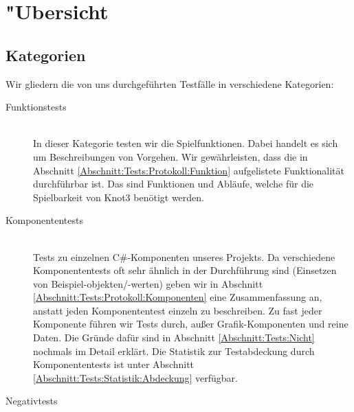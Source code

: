 %



\section{{"U}bersicht}
\label{Abschnitt:Tests:Uebersicht}



\subsection{Kategorien}
\label{Abschnitt:Tests:Uebersicht:Kategorien}

Wir gliedern die von uns durchgeführten Testfälle in verschiedene Kategorien:\\


\begin{description} %


	\item[Funktionstests] \hfill
	\\
	
	In dieser Kategorie testen wir die Spielfunktionen. Dabei handelt es sich um Beschreibungen von Vorgehen. Wir gewährleisten, dass die in Abschnitt \ref{Abschnitt:Tests:Protokoll:Funktion} aufgelistete Funktionalität durchführbar ist. Das sind Funktionen und Abläufe, welche für die Spielbarkeit von Knot3 benötigt werden.\\
	  
	
	\item[Komponententests] \hfill
	\\
	
	Tests zu einzelnen C\#-Komponenten unseres Projekts. Da verschiedene Komponententests oft sehr ähnlich in der Durchführung sind (Einsetzen von Beispiel-objekten/-werten) geben wir in Abschnitt \ref{Abschnitt:Tests:Protokoll:Komponenten} eine Zusammenfassung an, anstatt jeden Komponententest einzeln zu beschreiben.
	Zu fast jeder Komponente führen wir Tests durch, außer Grafik-Komponenten und reine Daten. Die Gründe dafür sind in Abschnitt \ref{Abschnitt:Tests:Nicht} nochmals im Detail erklärt. Die Statistik zur Testabdeckung durch Komponententests ist unter Abschnitt \ref{Abschnitt:Tests:Statistik:Abdeckung} verfügbar.\\


	\item[Negativtests] \hfill
	\\
	

\end{description}
